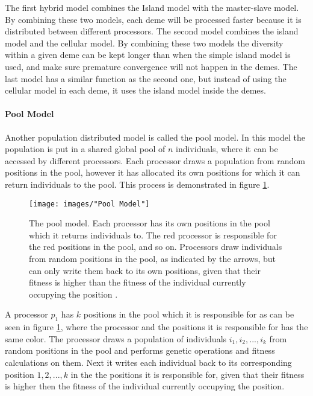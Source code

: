 \noindent The first hybrid model combines the Island model with the master-slave model. By combining these two models, each deme will be processed faster because it is distributed between different processors. The second model combines the island model and the cellular model. By combining these two models the diversity within a given deme can be kept longer than when the simple island model is used, and make sure premature convergence will not happen in the demes. The last model has a similar function as the second one, but instead of using the cellular model in each deme, it uses the island model inside the demes. \\


\paragraph*{Pool Model}
Another population distributed model is called the pool model. In this model the population is put in a shared global pool of $n$ individuals, where it can be accessed by different processors. Each processor draws a population from random positions in the pool, however it has allocated its own positions for which it can return individuals to the pool. This process is demonstrated in figure \ref{Pool Model}. \\


\begin{figure}[h!]
\begin{center}
\texttt{[image: images/"Pool Model"]}
\caption{The pool model. Each processor has its own positions in the pool which it returns individuals to. The red processor is responsible for the red positions in the pool, and so on. Processors draw individuals from random positions in the pool, as indicated by the arrows, but can only write them back to its own positions, given that their fitness is higher than the fitness of the individual currently occupying the position \citep{Gong}.}
\label{Pool Model}
\end{center}
\end{figure}


\noindent A processor $p_1$ has $k$ positions in the pool which it is responsible for as can be seen in figure \ref{Pool Model}, where the processor and the positions it is responsible for has the same color. The processor draws a population of individuals $i_1, i_2,...,i_k$ from random positions in the pool and performs genetic operations and fitness calculations on them. Next it writes each individual back to its corresponding position $1, 2,...,k$ in the the positions it is responsible for, given that their fitness is higher then the fitness of the individual currently occupying the position.\\


